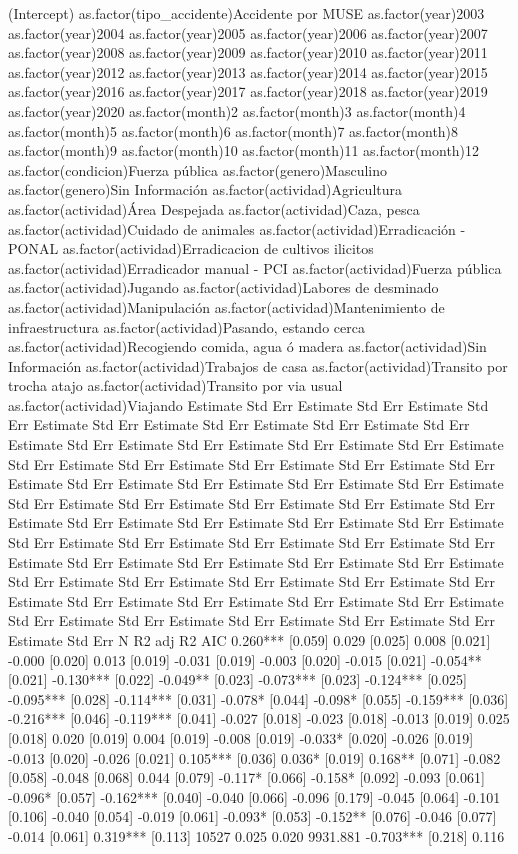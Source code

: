 (Intercept)  as.factor(tipo_accidente)Accidente por MUSE  as.factor(year)2003  as.factor(year)2004  as.factor(year)2005  as.factor(year)2006  as.factor(year)2007  as.factor(year)2008  as.factor(year)2009  as.factor(year)2010  as.factor(year)2011  as.factor(year)2012  as.factor(year)2013  as.factor(year)2014  as.factor(year)2015  as.factor(year)2016  as.factor(year)2017  as.factor(year)2018  as.factor(year)2019  as.factor(year)2020  as.factor(month)2  as.factor(month)3  as.factor(month)4  as.factor(month)5  as.factor(month)6  as.factor(month)7  as.factor(month)8  as.factor(month)9  as.factor(month)10  as.factor(month)11  as.factor(month)12  as.factor(condicion)Fuerza pública  as.factor(genero)Masculino  as.factor(genero)Sin Información  as.factor(actividad)Agricultura  as.factor(actividad)Área Despejada  as.factor(actividad)Caza, pesca  as.factor(actividad)Cuidado de animales  as.factor(actividad)Erradicación - PONAL  as.factor(actividad)Erradicacion de cultivos ilicitos  as.factor(actividad)Erradicador manual - PCI  as.factor(actividad)Fuerza pública  as.factor(actividad)Jugando  as.factor(actividad)Labores de desminado  as.factor(actividad)Manipulación  as.factor(actividad)Mantenimiento de infraestructura  as.factor(actividad)Pasando, estando cerca  as.factor(actividad)Recogiendo comida, agua ó  madera  as.factor(actividad)Sin Información  as.factor(actividad)Trabajos de casa  as.factor(actividad)Transito por trocha atajo  as.factor(actividad)Transito por via usual  as.factor(actividad)Viajando      Estimate Std Err Estimate Std Err Estimate Std Err Estimate Std Err Estimate Std Err Estimate Std Err Estimate Std Err Estimate Std Err Estimate Std Err Estimate Std Err Estimate Std Err Estimate Std Err Estimate Std Err Estimate Std Err Estimate Std Err Estimate Std Err Estimate Std Err Estimate Std Err Estimate Std Err Estimate Std Err Estimate Std Err Estimate Std Err Estimate Std Err Estimate Std Err Estimate Std Err Estimate Std Err Estimate Std Err Estimate Std Err Estimate Std Err Estimate Std Err Estimate Std Err Estimate Std Err Estimate Std Err Estimate Std Err Estimate Std Err Estimate Std Err Estimate Std Err Estimate Std Err Estimate Std Err Estimate Std Err Estimate Std Err Estimate Std Err Estimate Std Err Estimate Std Err Estimate Std Err Estimate Std Err Estimate Std Err Estimate Std Err Estimate Std Err Estimate Std Err Estimate Std Err Estimate Std Err Estimate Std Err N R2 adj R2 AIC 0.260*** [0.059] 0.029 [0.025] 0.008 [0.021] -0.000 [0.020] 0.013 [0.019] -0.031 [0.019] -0.003 [0.020] -0.015 [0.021] -0.054** [0.021] -0.130*** [0.022] -0.049** [0.023] -0.073*** [0.023] -0.124*** [0.025] -0.095*** [0.028] -0.114*** [0.031] -0.078* [0.044] -0.098* [0.055] -0.159*** [0.036] -0.216*** [0.046] -0.119*** [0.041] -0.027 [0.018] -0.023 [0.018] -0.013 [0.019] 0.025 [0.018] 0.020 [0.019] 0.004 [0.019] -0.008 [0.019] -0.033* [0.020] -0.026 [0.019] -0.013 [0.020] -0.026 [0.021] 0.105*** [0.036] 0.036* [0.019] 0.168** [0.071] -0.082 [0.058] -0.048 [0.068] 0.044 [0.079] -0.117* [0.066] -0.158* [0.092] -0.093 [0.061] -0.096* [0.057] -0.162*** [0.040] -0.040 [0.066] -0.096 [0.179] -0.045 [0.064] -0.101 [0.106] -0.040 [0.054] -0.019 [0.061] -0.093* [0.053] -0.152** [0.076] -0.046 [0.077] -0.014 [0.061] 0.319*** [0.113] 10527 0.025 0.020 9931.881 -0.703*** [0.218] 0.116 